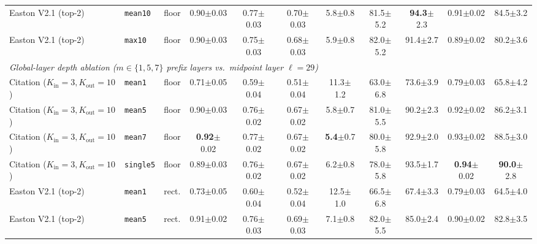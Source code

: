 \begin{table}[t]
{\begin{tabular}{lllcccccccc}
Easton V2.1 (top-2) & \texttt{mean10} & floor & 0.90{\scriptsize$\pm$0.03} & 0.77{\scriptsize$\pm$0.03} & 0.70{\scriptsize$\pm$0.03} & 5.8{\scriptsize$\pm$0.8} & 81.5{\scriptsize$\pm$5.2} & \textbf{94.3}{\scriptsize$\pm$2.3} & 0.91{\scriptsize$\pm$0.02} & 84.5{\scriptsize$\pm$3.2} \\
Easton V2.1 (top-2) & \texttt{max10} & floor & 0.90{\scriptsize$\pm$0.03} & 0.75{\scriptsize$\pm$0.03} & 0.68{\scriptsize$\pm$0.03} & 5.9{\scriptsize$\pm$0.8} & 82.0{\scriptsize$\pm$5.2} & 91.4{\scriptsize$\pm$2.7} & 0.89{\scriptsize$\pm$0.02} & 80.2{\scriptsize$\pm$3.6} \\
\midrule
\multicolumn{11}{l}{\emph{Global-layer depth ablation ($m \in \{1, 5, 7\}$ prefix layers vs.\ midpoint layer $\ell = 29$)}} \\
Citation ($K_{\mathrm{in}}{=}3, K_{\mathrm{out}}{=}10$) & \texttt{mean1} & floor & 0.71{\scriptsize$\pm$0.05} & 0.59{\scriptsize$\pm$0.04} & 0.51{\scriptsize$\pm$0.04} & 11.3{\scriptsize$\pm$1.2} & 63.0{\scriptsize$\pm$6.8} & 73.6{\scriptsize$\pm$3.9} & 0.79{\scriptsize$\pm$0.03} & 65.8{\scriptsize$\pm$4.2} \\
Citation ($K_{\mathrm{in}}{=}3, K_{\mathrm{out}}{=}10$) & \texttt{mean5} & floor & 0.90{\scriptsize$\pm$0.03} & 0.76{\scriptsize$\pm$0.02} & 0.67{\scriptsize$\pm$0.02} & 5.8{\scriptsize$\pm$0.7} & 81.0{\scriptsize$\pm$5.5} & 90.2{\scriptsize$\pm$2.3} & 0.92{\scriptsize$\pm$0.02} & 86.2{\scriptsize$\pm$3.1} \\
Citation ($K_{\mathrm{in}}{=}3, K_{\mathrm{out}}{=}10$) & \texttt{mean7} & floor & \textbf{0.92}{\scriptsize$\pm$0.02} & 0.77{\scriptsize$\pm$0.02} & 0.67{\scriptsize$\pm$0.02} & \textbf{5.4}{\scriptsize$\pm$0.7} & 80.0{\scriptsize$\pm$5.8} & 92.9{\scriptsize$\pm$2.0} & 0.93{\scriptsize$\pm$0.02} & 88.5{\scriptsize$\pm$3.0} \\
Citation ($K_{\mathrm{in}}{=}3, K_{\mathrm{out}}{=}10$) & \texttt{single5} & floor & 0.89{\scriptsize$\pm$0.03} & 0.76{\scriptsize$\pm$0.02} & 0.67{\scriptsize$\pm$0.02} & 6.2{\scriptsize$\pm$0.8} & 78.0{\scriptsize$\pm$5.8} & 93.5{\scriptsize$\pm$1.7} & \textbf{0.94}{\scriptsize$\pm$0.02} & \textbf{90.0}{\scriptsize$\pm$2.8} \\
Easton V2.1 (top-2) & \texttt{mean1} & rect. & 0.73{\scriptsize$\pm$0.05} & 0.60{\scriptsize$\pm$0.04} & 0.52{\scriptsize$\pm$0.04} & 12.5{\scriptsize$\pm$1.0} & 66.5{\scriptsize$\pm$6.8} & 67.4{\scriptsize$\pm$3.3} & 0.79{\scriptsize$\pm$0.03} & 64.5{\scriptsize$\pm$4.0} \\
Easton V2.1 (top-2) & \texttt{mean5} & rect. & 0.91{\scriptsize$\pm$0.02} & 0.76{\scriptsize$\pm$0.03} & 0.69{\scriptsize$\pm$0.03} & 7.1{\scriptsize$\pm$0.8} & 82.0{\scriptsize$\pm$5.5} & 85.0{\scriptsize$\pm$2.4} & 0.90{\scriptsize$\pm$0.02} & 82.8{\scriptsize$\pm$3.5} \\

\end{tabular}}
\end{table}
